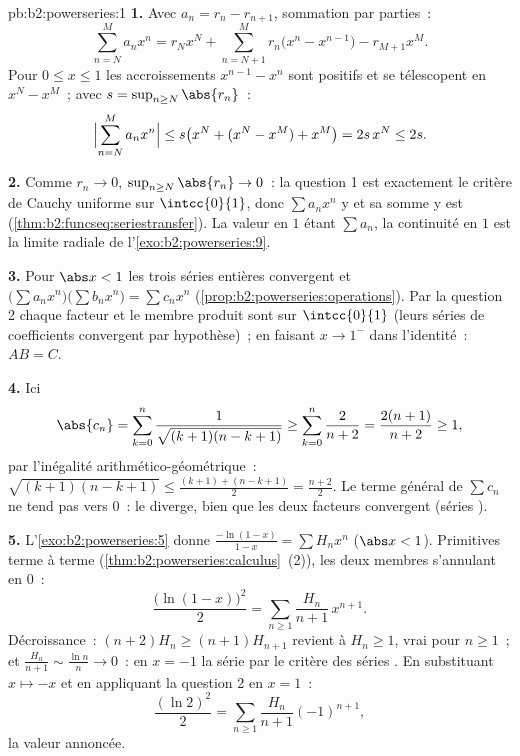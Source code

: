\begin{solution}{pb:b2:powerseries:1}
\textbf{1.} Avec $a_n = r_n - r_{n+1}$, sommation par parties~:
\[
\sum_{n=N}^{M} a_nx^n
= r_Nx^N + \sum_{n=N+1}^{M} r_n\bigl(x^n - x^{n-1}\bigr)
- r_{M+1}x^M .
\]
Pour $0 \leq x \leq 1$ les accroissements $x^{n-1} - x^n$ sont
positifs et se télescopent en $x^N - x^M$~; avec $s = \sup_{n\geq
N}\abs{r_n}$~:
\[
\Bigl|\sum_{n=N}^{M}a_nx^n\Bigr|
\leq s\bigl(x^N + (x^N - x^M) + x^M\bigr) = 2s\,x^N \leq 2s .
\]

\textbf{2.} Comme $r_n \to 0$, $\sup_{n\geq N}\abs{r_n} \to 0$~:
la question 1 est exactement le critère de Cauchy uniforme sur
$\intcc{0}{1}$, donc $\sum a_nx^n$ y   et
sa somme y est  (\cref{thm:b2:funcseq:seriestransfer}).
La valeur en $1$ étant $\sum a_n$, la continuité en $1$ est la
limite radiale de l'\cref{exo:b2:powerseries:9}.

\textbf{3.} Pour $\abs x < 1$ les trois séries entières convergent
 et $\bigl(\sum a_nx^n\bigr)\bigl(\sum b_nx^n\bigr)
= \sum c_nx^n$ (\cref{prop:b2:powerseries:operations}). Par la
question 2 chaque facteur et le membre produit sont  sur
$\intcc{0}{1}$ (leurs séries de coefficients convergent par
hypothèse)~; en faisant $x \to 1^-$ dans l'identité~: $AB = C$.

\textbf{4.} Ici
\[
\abs{c_n} = \sum_{k=0}^{n}
\frac{1}{\sqrt{(k+1)(n-k+1)}}
\geq \sum_{k=0}^{n}\frac{2}{n+2}
= \frac{2(n+1)}{n+2} \geq 1,
\]
par l'inégalité arithmético-géométrique~: $\sqrt{(k+1)(n-k+1)} \leq \frac{(k+1) +
(n-k+1)}{2} = \frac{n+2}{2}$. Le terme général de $\sum c_n$
ne tend pas vers $0$~: le  diverge, bien que
les deux facteurs convergent (séries ).

\textbf{5.} L'\cref{exo:b2:powerseries:5} donne
$\frac{-\ln(1-x)}{1-x} = \sum H_nx^n$ ($\abs x < 1$).
Primitives terme à terme
(\cref{thm:b2:powerseries:calculus}~(2)), les deux membres s'annulant
en $0$~:
\[
\frac{\bigl(\ln(1-x)\bigr)^2}{2}
= \sum_{n\geq1}\frac{H_n}{n+1}\,x^{n+1} .
\]
Décroissance~: $(n+2)H_n \geq (n+1)H_{n+1}$ revient à $H_n \geq
1$, vrai pour $n \geq 1$~; et $\frac{H_n}{n+1} \sim \frac{\ln
n}{n} \to 0$~: en $x = -1$ la série  par le
critère des séries . En substituant $x \mapsto -x$ et en appliquant
la question 2 en $x = 1$~:
\[
\frac{(\ln 2)^2}{2}
= \sum_{n\geq1}\frac{H_n}{n+1}(-1)^{n+1},
\]
la valeur annoncée.


\end{solution}
